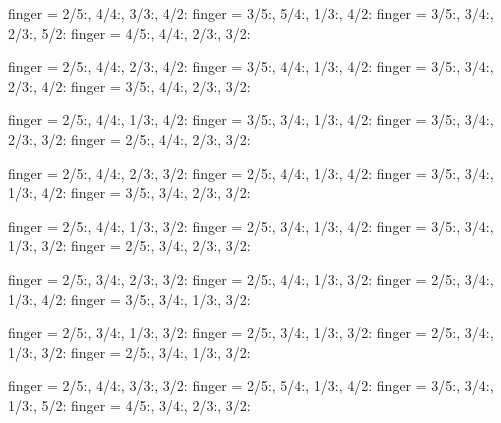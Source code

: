 \documentclass[../main.tex]{subfiles}
\begin{document}

  {finger = {2/5:\R, 4/4:, 3/3:, 4/2:}}
  {finger = {3/5:, 5/4:, 1/3:\R, 4/2:}}
  {finger = {3/5:, 3/4:\R, 2/3:, 5/2:}}
  {finger = {4/5:, 4/4:, 2/3:, 3/2:\R}}

  {finger = {2/5:\R, 4/4:, 2/3:, 4/2:}}
  {finger = {3/5:, 4/4:, 1/3:\R, 4/2:}}
  {finger = {3/5:, 3/4:\R, 2/3:, 4/2:}}
  {finger = {3/5:, 4/4:, 2/3:, 3/2:\R}}

  {finger = {2/5:\R, 4/4:, 1/3:, 4/2:}}
  {finger = {3/5:, 3/4:, 1/3:\R, 4/2:}}
  {finger = {3/5:, 3/4:\R, 2/3:, 3/2:}}
  {finger = {2/5:, 4/4:, 2/3:, 3/2:\R}}

  {finger = {2/5:\R, 4/4:, 2/3:, 3/2:}}
  {finger = {2/5:, 4/4:, 1/3:\R, 4/2:}}
  {finger = {3/5:, 3/4:\R, 1/3:, 4/2:}}
  {finger = {3/5:, 3/4:, 2/3:, 3/2:\R}}


  {finger = {2/5:\R, 4/4:, 1/3:, 3/2:}}
  {finger = {2/5:, 3/4:, 1/3:\R, 4/2:}}
  {finger = {3/5:, 3/4:\R, 1/3:, 3/2:}}
  {finger = {2/5:, 3/4:, 2/3:, 3/2:\R}}

  {finger = {2/5:\R, 3/4:, 2/3:, 3/2:}}
  {finger = {2/5:, 4/4:, 1/3:\R, 3/2:}}
  {finger = {2/5:, 3/4:\R, 1/3:, 4/2:}}
  {finger = {3/5:, 3/4:, 1/3:, 3/2:\R}}


  {finger = {2/5:\R, 3/4:, 1/3:, 3/2:}}
  {finger = {2/5:, 3/4:, 1/3:\R, 3/2:}}
  {finger = {2/5:, 3/4:\R, 1/3:, 3/2:}}
  {finger = {2/5:, 3/4:, 1/3:, 3/2:\R}}

  {finger = {2/5:\R, 4/4:, 3/3:, 3/2:}}
  {finger = {2/5:, 5/4:, 1/3:\R, 4/2:}}
  {finger = {3/5:, 3/4:\R, 1/3:, 5/2:}}
  {finger = {4/5:, 3/4:, 2/3:, 3/2:\R}}
\end{document}
